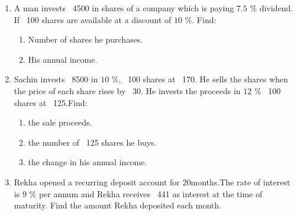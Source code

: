 \begin{enumerate}

\item A man invests \rupee~4500  in shares of a company which is paying $7.5$ $\%$ dividend. 
      If \rupee~100 shares are available at a discount of $10$ $\%$.
      Find:
      \begin{enumerate}
	\item Number of shares he purchases.
	\item His annual income.
      \end{enumerate}

\item Sachin invests \rupee~8500 in $10$ $\%$, \rupee~100 shares at \rupee~170. He sells the shares when the price of each share rises by \rupee~30. He invests the proceeds in $12$ $\%$ \rupee~100 shares at \rupee~125.Find:
\begin{enumerate}
    \item the sale proceeds.
    \item the number of \rupee~125 shares he buys.
    \item the change in his annual income.
\end{enumerate}

\item Rekha opened a recurring deposit account for $20$months.The rate of interest is $9$ $\%$ per annum and Rekha receives \rupee~441 as interest at the time of maturity.
Find the amount Rekha deposited each month.

\end{enumerate}

